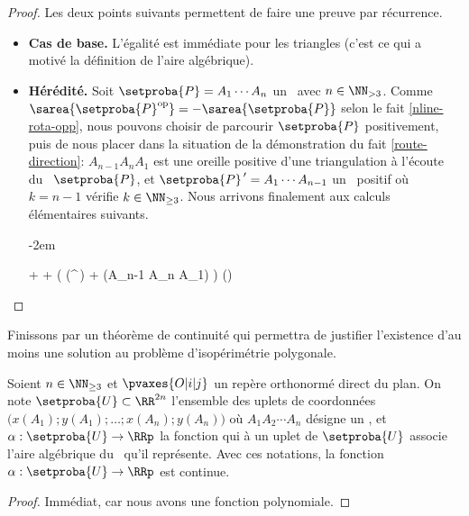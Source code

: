 \begin{proof}
    Les deux points suivants permettent de faire une preuve par récurrence.

    \begin{itemize}
		\item \textbf{Cas de base.}
		L'égalité est immédiate pour les triangles (c'est ce qui a motivé la définition de l'aire algébrique).


		\item \textbf{Hérédité.}
		Soit $\setproba{P} = A_1 \cdots A_n$ un \ngone\ avec $n \in \NN_{>3}$.
		Comme $\sarea{\setproba{P}^{\mathrm{op}}} = - \sarea{\setproba{P}}$ selon le fait \ref{nline-rota-opp}, nous pouvons choisir de parcourir $\setproba{P}$ positivement, puis de nous placer dans la situation de la démonstration du fait \ref{route-direction}:
		$A_{n-1} A_n A_1$ est une oreille positive d'une triangulation à l'écoute du \ngone\ $\setproba{P}$, et $\setproba{P}^{\,\prime} = A_1 \cdots A_{n-1}$ un \kgone\ positif où $k = n-1$ vérifie $k \in \NN_{\geq3}$.
		Nous arrivons finalement aux calculs élémentaires suivants.
		
		\leavevmode\kern-2em%
		\begin{stepcalc}[style=ar*]
		          {}
		     + 
		          {}
		      +  
		          {}
		     \big( \mu(^{\,\prime}) + \mu(A_{n-1} A_n A_1) \big)
		          {}
		     \mu()
		          {}
		     
		\explnext{}
		\end{stepcalc}
    \end{itemize}
    
    \null\vspace{-3.5ex}
\end{proof}




Finissons par un théorème de continuité qui permettra de justifier l'existence d'au moins une solution au problème d'isopérimétrie polygonale.


\begin{fact} \label{sarea-cont}
    Soient $n \in \NN_{\geq3}$ et
    $\pvaxes{O | i | j}$ un repère orthonormé direct du plan. 
    On note $\setproba{U} \subset \RR^{2n}$ l'ensemble des uplets de coordonnées $\big( x(A_1) ; y(A_1) ; \dots ; x(A_n) ; y(A_n) \big)$ où $A_1 A_2 \cdots A_n$ désigne un \ncycle,
    et $\alpha: \setproba{U} \rightarrow \RRp$ la fonction qui à un uplet de $\setproba{U}$ associe l'aire algébrique du \ncycle\ qu'il représente.
	Avec ces notations, la fonction $\alpha: \setproba{U} \rightarrow \RRp$ est continue.
\end{fact}


\begin{proof}
	Immédiat, car nous avons une fonction polynomiale.
\end{proof}
